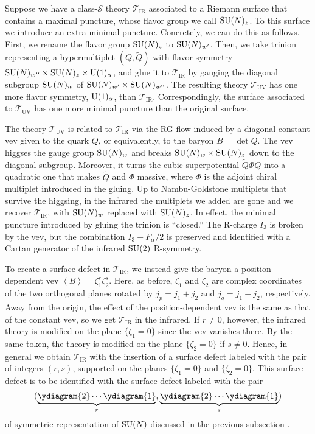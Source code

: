 Suppose we have a class-$\mathcal{S}$ theory $\mathcal{T}_{\mathrm{IR}}$
associated to a Riemann surface that contains a maximal puncture,
whose flavor group we call $\mathrm{SU}(N)_{z}$. To this surface we introduce
an extra minimal puncture. Concretely, we can do this as follows.
First, we rename the flavor group $\mathrm{SU}(N)_{z}$ to $\mathrm{SU}(N)_{w'}$. Then,
we take trinion representing a hypermultiplet $(Q,\tilde{Q})$ with
flavor symmetry $\mathrm{SU}(N)_{w''} \times \mathrm{SU}(N)_{z}\times \mathrm{U}(1)_{\alpha}$,
and glue it to $\mathcal{T}_{\mathrm{IR}}$ by gauging the diagonal
subgroup $\mathrm{SU}(N)_{w}$ of $\mathrm{SU}(N)_{w'}\times \mathrm{SU}(N)_{w''}$. The resulting
theory $\mathcal{T}_{\mathrm{UV}}$ has one more flavor symmetry,
$\mathrm{U}(1)_{\alpha}$, than $\mathcal{T}_{\mathrm{IR}}$. Correspondingly,
the surface associated to $\mathcal{T}_{\mathrm{UV}}$ has one more
minimal puncture than the original surface.

The theory $\mathcal{T}_{\mathrm{UV}}$ is related to $\mathcal{T}_{\mathrm{IR}}$
via the RG flow induced by a diagonal constant vev given to the quark
$Q$, or equivalently, to the baryon $B=\det Q$. The vev higgses
the gauge group $\mathrm{SU}(N)_{w}$ and breaks $\mathrm{SU}(N)_{w} \times \mathrm{SU}(N)_{z}$
down to the diagonal subgroup. Moreover, it turns the cubic superpotential
$\tilde{Q} \Phi Q$ into a quadratic one that makes $\tilde{Q}$ and
$\Phi$ massive, where $\Phi$ is the adjoint chiral multiplet introduced
in the gluing. Up to Nambu-Goldstone multiplets that survive the higgsing,
in the infrared the multiplets we added are gone and we recover $\mathcal{T}_{\mathrm{IR}}$,
with $\mathrm{SU}(N)_{w}$ replaced with $\mathrm{SU}(N)_{z}$. In effect, the minimal
puncture introduced by gluing the trinion is ``closed.'' The R-charge
$I_{3}$ is broken by the vev, but the combination $I_{3}+F_{\alpha}/2$
is preserved and identified with a Cartan generator of the infrared
$\mathrm{SU}(2)$ R-symmetry.

To create a surface defect in $\mathcal{T}_{\mathrm{IR}}$, we instead
give the baryon a position-dependent vev $\left\langle B\right\rangle = \zeta_{1}^{r}\zeta_{2}^{s}$.
Here, as before, $\zeta_{1}$ and $\zeta_{2}$ are complex coordinates
of the two orthogonal planes rotated by $j_{p}=j_{1}+j_{2}$ and $j_{q}=j_{1}-j_{2}$,
respectively. Away from the origin, the effect of the position-dependent
vev is the same as that of the constant vev, so we get $\mathcal{T}_{\mathrm{IR}}$
in the infrared. If $r\neq0$, however, the infrared theory is modified
on the plane $\{\zeta_{1}=0\}$ since the vev vanishes there. By the
same token, the theory is modified on the plane $\{\zeta_{2}=0\}$
if $s\neq0$. Hence, in general we obtain $\mathcal{T}_{\mathrm{IR}}$
with the insertion of a surface defect labeled with the pair of integers
$(r,s)$, supported on the planes $\{\zeta_{1}=0\}$ and $\{\zeta_{2}=0\}$.
This surface defect is to be identified with the surface defect labeled
with the pair
\begin{equation*}
  (\underbrace{\ydiagram{2}\cdots\ydiagram{1}}_{r}, \underbrace{\ydiagram{2}\cdots\ydiagram{1}}_{s})
\end{equation*}
of symmetric representation of
$\mathrm{SU}(N)$ discussed in the previous subsection \cite{Gadde:2013dda}.

